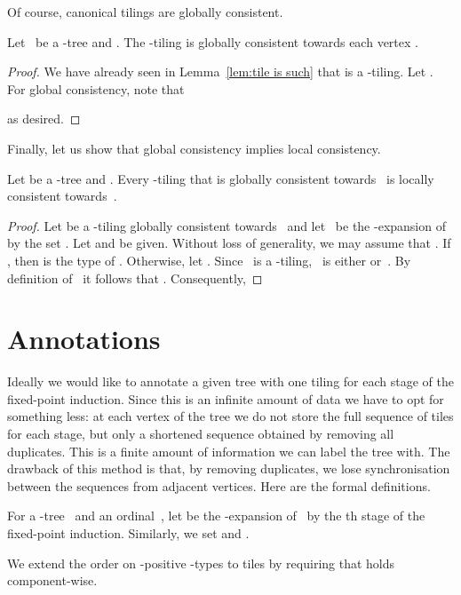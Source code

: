\documentclass{LMCS}
\begin{document}
Of course, canonical tilings are globally consistent.
\begin{lem}\label{lem:tiling is such}
Let ~be a -tree and .
The -tiling  is
globally consistent towards each vertex .
\end{lem}
\begin{proof}
We have already seen in Lemma~\ref{lem:tile is such} that  is a -tiling.
Let . For global consistency, note that

as desired.
\end{proof}

Finally, let us show that global consistency implies
local consistency.
\begin{lem}\label{lem:global implies local for tiling}
Let  be a -tree and .
Every -tiling that is globally consistent towards~
is locally consistent towards~.
\end{lem}

\begin{proof}
Let  be a -tiling globally consistent towards~
and let~ be the -expansion of~ by the set
.
Let  and  be given.
Without loss of generality, we may assume that .
If , then  is the type of
.
Otherwise, let .
Since ~is a -tiling, ~is either 
or~. By definition of~ it follows that
. Consequently,

\end{proof}



\section{Annotations}
\label{sect:annots}


Ideally we would like to annotate a given tree with one tiling for each stage
of the fixed-point induction. Since this is an infinite amount of data we have
to opt for something less\?: at each vertex of the tree we do not store the
full sequence of tiles for each stage, but only a shortened sequence
obtained by removing all duplicates. This is a finite amount of information
we can label the tree with.
The drawback of this method is that, by removing duplicates,
we lose synchronisation between the sequences from adjacent vertices.
Here are the formal definitions.

For a -tree~ and an ordinal~,
let 
be the -expansion of~
by the th stage of the fixed-point induction.
Similarly, we set 
and .

We extend the order  on -positive -types
to tiles by requiring that  holds component-wise.
\end{document}
